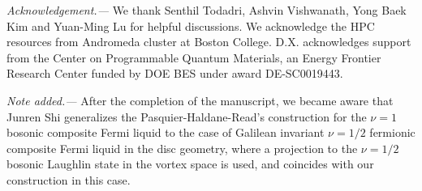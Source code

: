 \vspace{1em}
\noindent\emph{Acknowledgement.---} We thank Senthil Todadri, Ashvin Vishwanath, Yong Baek Kim and Yuan-Ming Lu for helpful discussions. We acknowledge the HPC resources from Andromeda cluster at Boston College.  D.X. acknowledges support from the Center on Programmable Quantum Materials, an Energy Frontier Research Center funded by DOE BES under award DE-SC0019443.


\vspace{1em}
\noindent\emph{Note added.---} After the completion of the manuscript, we became aware that Junren Shi \cite{shi2023quantum} generalizes the Pasquier-Haldane-Read’s construction for the $\nu=1$ bosonic composite Fermi liquid to the case of Galilean invariant $\nu=1/2$ fermionic composite Fermi liquid in the disc geometry, where a projection to the $\nu=1/2$ bosonic Laughlin state in the vortex space is used, and coincides with our construction in this case.





